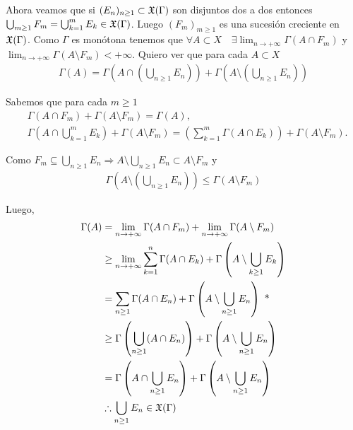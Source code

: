 Ahora veamos que si \((E_n)_{n \geq 1} \subset \mathfrak{X}(\Gamma)\) son disjuntos dos a dos entonces \(\bigcup_{m \geq 1} F_m = \bigcup_{k = 1}^m E_k \in \mathfrak{X}(\Gamma)\). Luego \((F_m)_{m \geq 1}\) es una sucesión
creciente en \(\mathfrak{X}(\Gamma)\). Como \(\Gamma\) es monótona tenemos que \(\forall A \subset X \quad \exists \lim_{n \to +\infty} \Gamma(A \cap F_m)\) y \(\lim_{n \to +\infty} \Gamma(A \setminus F_m) < +\infty\).
Quiero ver que para cada \(A \subset X\) \begin{align*}
    \Gamma(A) = \Gamma\left(A \cap \left(\bigcup_{n \geq 1} E_n\right)\right) + \Gamma\left(A \setminus \left(\bigcup_{n \geq 1} E_n\right) \right)
\end{align*}

Sabemos que para cada \(m \geq 1\)
\begin{align*}
     & \Gamma(A \cap F_m) + \Gamma(A \setminus F_m) = \Gamma(A),                                                                                          \\
     & \Gamma\left(A \cap \bigcup_{k=1}^m E_k\right) + \Gamma(A \setminus F_m) = \left(\sum_{k=1}^m \Gamma(A \cap E_k) \right) + \Gamma(A \setminus F_m).
\end{align*}

Como \(F_m \subseteq \bigcup_{n \geq 1} E_n \Rightarrow A \setminus \bigcup_{n \geq 1} E_n \subset A \setminus F_m\) y \begin{align*}
    \Gamma\left(A \setminus \left(\bigcup_{n \geq 1} E_n \right)\right) \leq \Gamma(A \setminus F_m)
\end{align*}

Luego, \begin{align*}
    \Gamma(A) & = \lim_{n \to +\infty} \Gamma(A \cap F_m) + \lim_{n \to +\infty} \Gamma(A \setminus F_m)                            \\
              & \geq \lim_{n \to +\infty} \sum_{k = 1}^n \Gamma(A \cap E_k) + \Gamma\left(A \setminus \bigcup_{k \geq 1} E_k\right) \\
              & = \sum_{n \geq 1} \Gamma(A \cap E_n) + \Gamma\left(A \setminus \bigcup_{n \geq 1} E_n \right) \text{ *}             \\
              & \geq \Gamma\left(\bigcup_{n \geq 1} (A \cap E_n)\right) + \Gamma\left(A \setminus \bigcup_{n \geq 1} E_n \right)    \\
              & = \Gamma\left(A \cap \bigcup_{n \geq 1} E_n\right) + \Gamma\left(A \setminus \bigcup_{n \geq 1} E_n \right)         \\
              & \therefore \bigcup_{n \geq 1} E_n \in \mathfrak{X}(\Gamma)
\end{align*}

